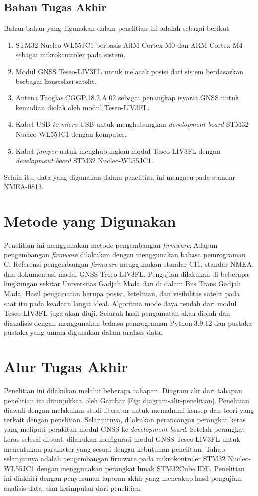 \subsection{Bahan Tugas Akhir}
Bahan-bahan yang digunakan dalam penelitian ini adalah sebagai berikut:
\begin{enumerate}
	\item STM32 Nucleo-WL55JC1 berbasis ARM Cortex-M0 dan ARM Cortex-M4 sebagai mikrokontroler pada sistem.
	\item Modul GNSS Teseo-LIV3FL untuk melacak posisi dari sistem berdasarkan berbagai konstelasi satelit.
	\item Antena Taoglas CGGP.18.2.A.02 sebagai penangkap isyarat GNSS untuk kemudian diolah oleh modul Teseo-LIV3FL.
	\item Kabel USB \textit{to} \textit{micro} USB untuk menghubungkan \textit{development board} STM32 Nucleo-WL55JC1 dengan komputer.
	\item Kabel \textit{jumper} untuk menghubungkan modul Teseo-LIV3FL dengan \textit{development board} STM32 Nucleo-WL55JC1.
\end{enumerate}
Selain itu, data yang digunakan dalam penelitian ini mengacu pada standar NMEA-0813.

\section{Metode yang Digunakan}
Penelitian ini menggunakan metode pengembangan \textit{firmware}. Adapun pengembangan \textit{firmware} dilakukan dengan menggunakan bahasa pemrograman C. Referensi pengembangan \textit{firmware} menggunakan standar C11, standar NMEA, dan dokumentasi modul GNSS Teseo-LIV3FL. Pengujian dilakukan di beberapa lingkungan sekitar Universitas Gadjah Mada dan di dalam Bus Trans Gadjah Mada. Hasil pengamatan berupa posisi, ketelitian, dan visibilitas satelit pada saat itu pada keadaan langit ideal. Algoritma mode daya rendah dari modul Teseo-LIV3FL juga akan diuji. Seluruh hasil pengamatan akan diolah dan dianalisis dengan menggunakan bahasa pemrograman Python 3.9.12 dan pustaka-pustaka yang umum digunakan dalam analisis data.

\section{Alur Tugas Akhir}
Penelitian ini dilakukan melalui beberapa tahapan. Diagram alir dari tahapan penelitian ini ditunjukkan oleh Gambar \ref{Fig: diagram-alir-penelitian}. Penelitian diawali dengan melakukan studi literatur untuk memahami konsep dan teori yang terkait dengan penelitian. Selanjutnya, dilakukan perancangan perangkat keras yang meliputi perakitan modul GNSS ke \textit{development board}. Setelah perangkat keras selesai dibuat, dilakukan konfigurasi modul GNSS Teseo-LIV3FL untuk menentukan parameter yang sesuai dengan kebutuhan penelitian. Tahap selanjutnya adalah pengembangan firmware pada mikrokontroler STM32 Nucleo-WL55JC1 dengan menggunakan perangkat lunak STM32Cube IDE. Penelitian ini diakhiri dengan penyusunan laporan akhir yang mencakup hasil pengujian, analisis data, dan kesimpulan dari penelitian.

